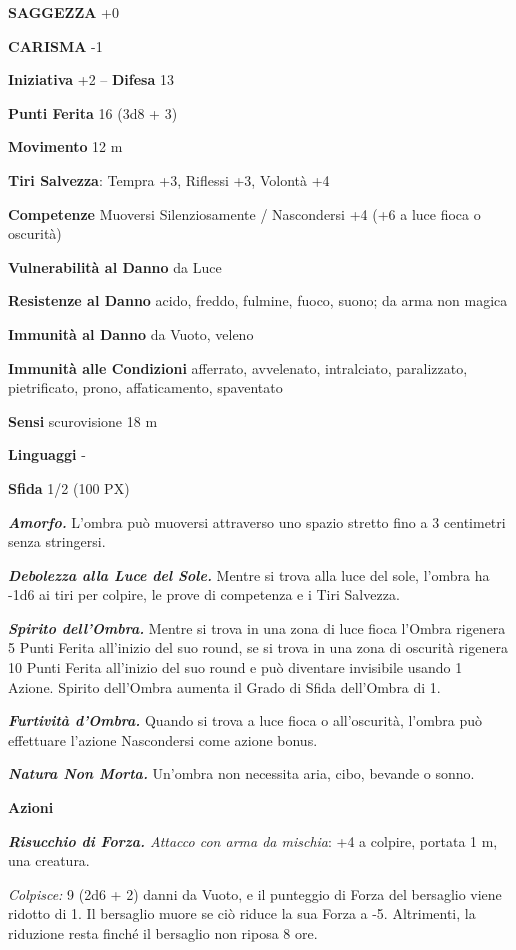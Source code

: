 \begin{multicols}{2}
\textbf{SAGGEZZA} +0

\textbf{CARISMA} -1

\textbf{Iniziativa} +2 -- \textbf{Difesa} 13

\textbf{Punti Ferita} 16 (3d8 + 3)

\textbf{Movimento} 12 m

\textbf{Tiri Salvezza}: Tempra +3, Riflessi +3, Volontà +4

\textbf{Competenze} Muoversi Silenziosamente / Nascondersi +4 (+6 a luce fioca o oscurità)

\textbf{Vulnerabilità al Danno} da Luce

\textbf{Resistenze al Danno} acido, freddo, fulmine, fuoco, suono; da arma non magica

\textbf{Immunità al Danno} da Vuoto, veleno

\textbf{Immunità alle Condizioni} afferrato, avvelenato, intralciato, paralizzato, pietrificato, prono, affaticamento, spaventato

\textbf{Sensi} scurovisione 18 m

\textbf{Linguaggi} -

\textbf{Sfida} 1/2 (100 PX)

\textit{\textbf{Amorfo.}} L'ombra può muoversi attraverso uno spazio stretto fino a 3 centimetri senza stringersi.

\textit{\textbf{Debolezza alla Luce del Sole.}} Mentre si trova alla luce del sole, l'ombra ha -1d6 ai tiri per colpire, le prove di competenza e i Tiri Salvezza.

\textit{\textbf{Spirito dell'Ombra.}} Mentre si trova in una zona di luce fioca l'Ombra rigenera 5 Punti Ferita all'inizio del suo round, se si trova in una zona di oscurità rigenera 10 Punti Ferita all'inizio del suo round e può diventare invisibile usando 1 Azione. Spirito dell'Ombra aumenta il Grado di Sfida dell'Ombra di 1.

\textit{\textbf{Furtività d'Ombra.}} Quando si trova a luce fioca o all'oscurità, l'ombra può effettuare l'azione Nascondersi come azione bonus.

\textit{\textbf{Natura Non Morta.}} Un'ombra non necessita aria, cibo, bevande o sonno.

\textbf{Azioni}

\textit{\textbf{Risucchio di Forza.} Attacco con arma da mischia}: +4 a colpire, portata 1 m, una creatura.

\textit{Colpisce:} 9 (2d6 + 2) danni da Vuoto, e il punteggio di Forza del bersaglio viene ridotto di 1. Il bersaglio muore se ciò riduce la sua Forza a -5. Altrimenti, la riduzione resta finché il bersaglio non riposa 8 ore.


\end{multicols}
